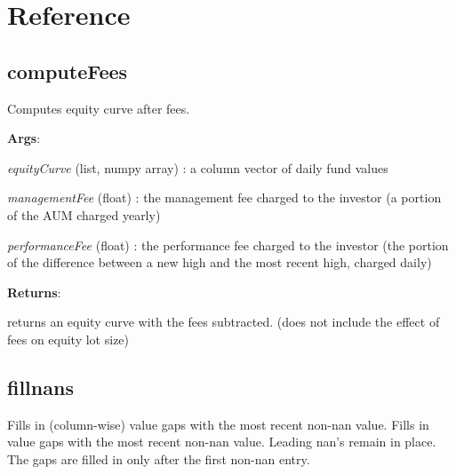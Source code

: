 \documentclass[letterpaper,10pt,english]{sphinxmanual}
\begin{document}
\chapter{Reference}
\label{reference:referenc-label}\label{reference::doc}\label{reference:reference}

\section{computeFees}
\label{reference:computefees}

\begin{fulllineitems}
\label{reference:quantiacsToolbox.computeFees}
\end{fulllineitems}


Computes equity curve after fees.

\textbf{Args}:

\emph{equityCurve} (list, numpy array) : a column vector of daily fund values

\emph{managementFee} (float) : the management fee charged to the investor (a portion of the AUM charged yearly)

\emph{performanceFee} (float) : the performance fee charged to the investor (the portion of the difference between a new high and the most recent high, charged daily)

\textbf{Returns}:

returns an equity curve with the fees subtracted. (does not include the effect of fees on equity lot size)


\section{fillnans}
\label{reference:fillnans}

\begin{fulllineitems}
\label{reference:quantiacsToolbox.fillnans}
\end{fulllineitems}


Fills in (column-wise) value gaps with the most recent non-nan value. Fills in value gaps with the most recent non-nan value. Leading nan’s remain in place. The gaps are filled in only after the first non-nan entry.
\end{document}
